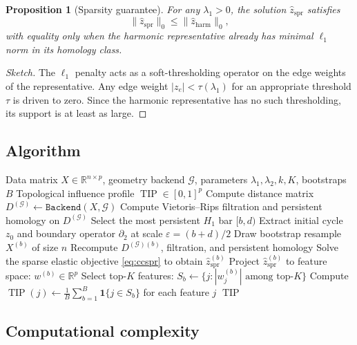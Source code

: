 \documentclass[11pt]{article}
\newtheorem{proposition}[theorem]{Proposition}
\DeclareMathOperator{\TIP}{TIP}
\begin{document}
\begin{proposition}[Sparsity guarantee]\label{prop:sparsity}
For any $\lambda_1 > 0$, the solution $\hat{z}_{\mathrm{spr}}$ satisfies
\[
\|\hat{z}_{\mathrm{spr}}\|_0 \le \|\hat{z}_{\mathrm{harm}}\|_0,
\]
with equality only when the harmonic representative already has minimal $\ell_1$ norm in its homology class.
\end{proposition}

\begin{proof}[Sketch]
The $\ell_1$ penalty acts as a soft-thresholding operator on the edge weights of the representative.
Any edge weight $|z_e| < \tau(\lambda_1)$ for an appropriate threshold $\tau$ is driven to zero.
Since the harmonic representative has no such thresholding, its support is at least as large.
\end{proof}

\subsection{Algorithm}

\begin{algorithm}[h]
\caption{CC-SPR Pipeline}
\label{alg:ccspr}
\begin{algorithmic}[1]
\REQUIRE Data matrix $X \in \mathbb{R}^{n \times p}$, geometry backend $\mathcal{G}$, parameters $\lambda_1, \lambda_2, k, K$, bootstraps $B$
\ENSURE Topological influence profile $\TIP \in [0,1]^p$
\STATE Compute distance matrix $D^{(\mathcal{G})} \gets \texttt{Backend}(X, \mathcal{G})$
\STATE Compute Vietoris--Rips filtration and persistent homology on $D^{(\mathcal{G})}$
\STATE Select the most persistent $H_1$ bar $[b, d)$
\STATE Extract initial cycle $z_0$ and boundary operator $\partial_2$ at scale $\varepsilon = (b + d)/2$
    \STATE Draw bootstrap resample $X^{(b)}$ of size $n$
    \STATE Recompute $D^{(\mathcal{G})(b)}$, filtration, and persistent homology
    \STATE Solve the sparse elastic objective \eqref{eq:ccspr} to obtain $\hat{z}_{\mathrm{spr}}^{(b)}$
    \STATE Project $\hat{z}_{\mathrm{spr}}^{(b)}$ to feature space: $w^{(b)} \in \mathbb{R}^p$
    \STATE Select top-$K$ features: $S_b \gets \{j : |w^{(b)}_j| \text{ among top-}K\}$
\ENDFOR
\STATE Compute $\TIP(j) \gets \frac{1}{B} \sum_{b=1}^B \mathbf{1}\{j \in S_b\}$ for each feature $j$
\RETURN $\TIP$
\end{algorithmic}
\end{algorithm}

\subsection{Computational complexity}
\end{document}
